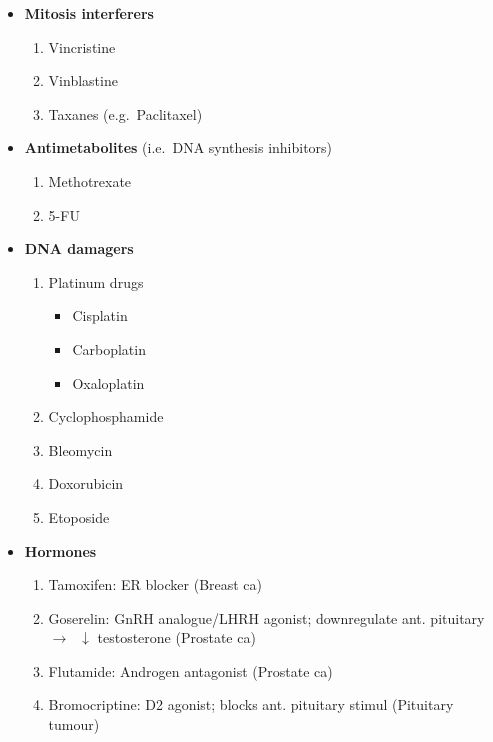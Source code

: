 \documentclass[
  12pt,
]{memoir}
\providecommand{\tightlist}{%
  \setlength{\itemsep}{0pt}\setlength{\parskip}{0pt}}
\begin{document}
\begin{itemize}
\tightlist
\item
  \textbf{Mitosis interferers}

  \begin{enumerate}
  \def\labelenumi{\arabic{enumi}.}
  \tightlist
  \item
    Vincristine
  \item
    Vinblastine
  \item
    Taxanes (e.g.~Paclitaxel)
  \end{enumerate}
\item
  \textbf{Antimetabolites} (i.e.~DNA synthesis inhibitors)

  \begin{enumerate}
  \def\labelenumi{\arabic{enumi}.}
  \tightlist
  \item
    Methotrexate
  \item
    5-FU
  \end{enumerate}
\item
  \textbf{DNA damagers}

  \begin{enumerate}
  \def\labelenumi{\arabic{enumi}.}
  \tightlist
  \item
    Platinum drugs

    \begin{itemize}
    \tightlist
    \item
      Cisplatin
    \item
      Carboplatin
    \item
      Oxaloplatin
    \end{itemize}
  \item
    Cyclophosphamide
  \item
    Bleomycin
  \item
    Doxorubicin
  \item
    Etoposide
  \end{enumerate}
\item
  \textbf{Hormones}

  \begin{enumerate}
  \def\labelenumi{\arabic{enumi}.}
  \tightlist
  \item
    Tamoxifen: ER blocker (Breast ca)
  \item
    Goserelin: GnRH analogue/LHRH agonist; downregulate ant. pituitary
    \(\rightarrow\;\;\downarrow\) testosterone (Prostate ca)
  \item
    Flutamide: Androgen antagonist (Prostate ca)
  \item
    Bromocriptine: D2 agonist; blocks ant. pituitary stimul (Pituitary
    tumour)
  \end{enumerate}
\end{itemize}
\end{document}
